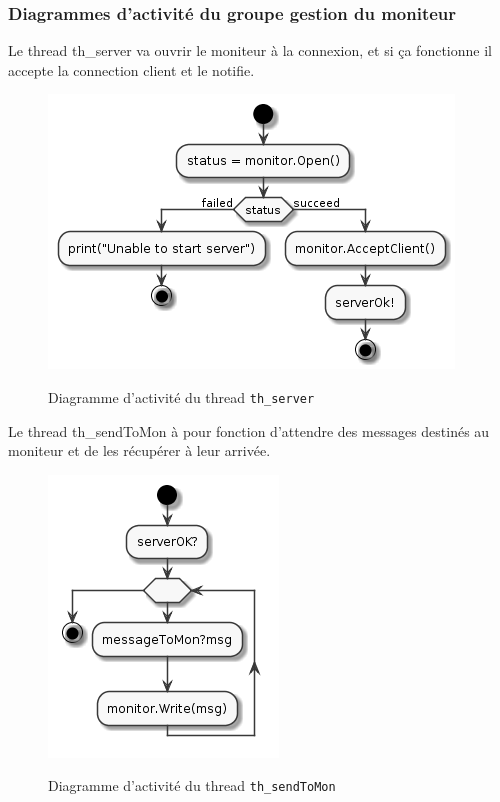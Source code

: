 \documentclass[11pt, a4paper]{paper}
\begin{document}
\subsubsection{Diagrammes d'activité  du groupe gestion du moniteur}

{Le thread th\_server va ouvrir le moniteur à la connexion, et si ça fonctionne il accepte la connection client et le notifie. } 

\begin{figure}[htbp]
\label{fig:act_envoyer}
\begin{center}
{\includegraphics[scale=.3]{./figures-pdf/th_server}}
{\caption{Diagramme d'activité du thread {\tt th\_server}}}
\end{center}
\end{figure}
\FloatBarrier

{Le thread th\_sendToMon à pour fonction d'attendre des messages destinés au moniteur et de les récupérer à leur arrivée. }

\begin{figure}[htbp]
\label{fig:act_envoyer}
\begin{center}
{\includegraphics[scale=.3]{./figures-pdf/th_sendToMon}}
{\caption{Diagramme d'activité du thread {\tt th\_sendToMon}}}
\end{center}
\end{figure}
\FloatBarrier
\end{document}
